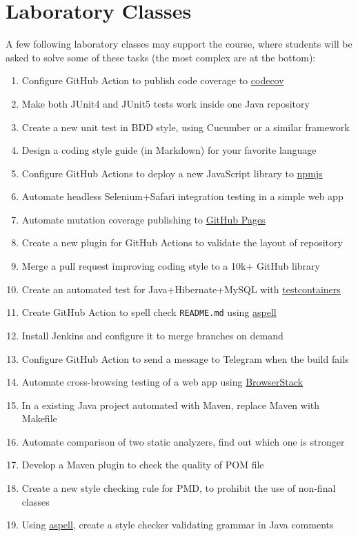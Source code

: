 \documentclass[nobrand,anonymous,nodate,nosecurity]{huawei}
\begin{document}
{\newpage
\section*{Laboratory Classes}

A few following laboratory classes may support the course, where students
will be asked to solve some of these tasks (the most complex are at the bottom):

\begin{enumerate}
	\item Configure GitHub Action to publish code coverage to \href{https://www.codecov.io}{codecov}
	\item Make both JUnit4 and JUnit5 tests work inside one Java repository
	\item Create a new unit test in BDD style, using Cucumber or a similar framework
	\item Design a coding style guide (in Markdown) for your favorite language
	\item Configure GitHub Actions to deploy a new JavaScript library to \href{https://npmjs.org}{npmjs}
	\item Automate headless Selenium+Safari integration testing in a simple web app
	\item Automate mutation coverage publishing to \href{https://pages.github.com}{GitHub Pages}
	\item Create a new plugin for GitHub Actions to validate the layout of repository
	\item Merge a pull request improving coding style to a 10k+ GitHub library
	\item Create an automated test for Java+Hibernate+MySQL with \href{https://www.testcontainers.org}{testcontainers}
	\item Create GitHub Action to spell check \texttt{README.md} using \href{http://aspell.net}{aspell}
	\item Install Jenkins and configure it to merge branches on demand
	\item Configure GitHub Action to send a message to Telegram when the build fails
	\item Automate cross-browsing testing of a web app using \href{https://www.browserstack.com}{BrowserStack}
	\item In a existing Java project automated with Maven, replace Maven with Makefile
	\item Automate comparison of two static analyzers, find out which one is stronger
	\item Develop a Maven plugin to check the quality of POM file
	\item Create a new style checking rule for PMD, to prohibit the use of non-final classes
	\item Using \href{http://aspell.net}{aspell}, create a style checker validating grammar in Java comments
\end{enumerate}

}
\end{document}

